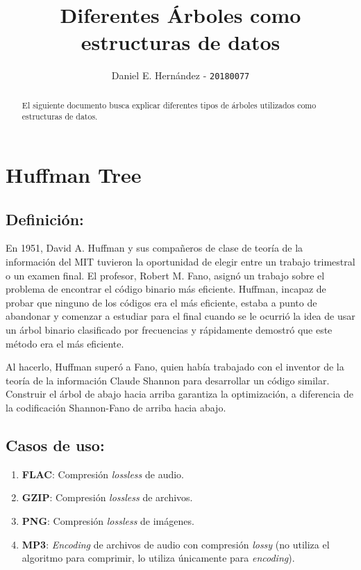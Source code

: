 \documentclass[]{article}
\title{\textbf{Diferentes Árboles como estructuras de datos}}
\author{Daniel E. Hernández - \texttt{20180077}}
\begin{document}
\maketitle

\begin{abstract}
El siguiente documento busca explicar diferentes tipos de árboles utilizados como estructuras de datos. 
\end{abstract}

\section{Huffman Tree}
	\subsection{Definición:}
		\par En 1951, David A. Huffman y sus compañeros de clase de teoría de la información del MIT tuvieron la oportunidad de elegir entre un trabajo trimestral o un examen final. El profesor, Robert M. Fano, asignó un trabajo sobre el problema de encontrar el código binario más eficiente. Huffman, incapaz de probar que ninguno de los códigos era el más eficiente, estaba a punto de abandonar y comenzar a estudiar para el final cuando se le ocurrió la idea de usar un árbol binario clasificado por frecuencias y rápidamente demostró que este método era el más eficiente.
		
		\par Al hacerlo, Huffman superó a Fano, quien había trabajado con el inventor de la teoría de la información Claude Shannon para desarrollar un código similar. Construir el árbol de abajo hacia arriba garantiza la optimización, a diferencia de la codificación Shannon-Fano de arriba hacia abajo.\cite{stixScientificAmericanArticle1991}
	\subsection{Casos de uso:}
		\begin{enumerate}
			\item \textbf{FLAC}: Compresión \textit{lossless} de audio.\cite{instituteofelectricalandelectronicsengineers20164thInternational2016}
			\item \textbf{GZIP}: Compresión \textit{lossless} de archivos. \cite{freesoftwarefundationGNUGzip2008}
			\item \textbf{PNG}: Compresión \textit{lossless} de imágenes. \cite{libpngPNGSpecificationDeflate}
			\item \textbf{MP3}: \textit{Encoding} de archivos de audio con compresión \textit{lossy} (no utiliza el algoritmo para comprimir, lo utiliza únicamente para \textit{encoding}). \cite{MP3TechOverview}
		\end{enumerate}
\end{document}
